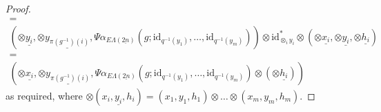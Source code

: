 \documentclass{amsbook} %
\newcommand{\id}{\textrm{id}}
\newcommand{\ELnn}{E\Lambda(\underline{2n})}
\numberwithin{section}{chapter}
\begin{document}
\begin{proof}
\[\begin{array}{c}
      = \\
      \left(\otimes \underline{y_i},\otimes \underline{y_{\pi(g^{-1})(i)}},\Psi \alpha_{\ELnn}(g;\id_{q^{-1}(y_1)}, \ldots, \id_{q^{-1}(y_m)})\right) \otimes \id_{\otimes_i y_i}^{\ast} \otimes (\otimes \underline{x_i}, \otimes \underline{y_i}, \otimes \underline{h_i}) \\
      = \\
      \left(\otimes \underline{x_i}, \otimes \underline{y_{\pi(g^{-1})(i)}}, \Psi \alpha_{\ELnn}(g;\id_{q^{-1}(y_1)}, \ldots, \id_{q^{-1}(y_m)}) \otimes (\otimes \underline{h_i})\right) 
    \end{array}
  \]
as required, where $\otimes (\underline{x_i,y_i,h_i}) = (x_1,y_1,h_1) \otimes \ldots \otimes (x_m,y_m,h_m)$.
\end{proof}









\end{document}
